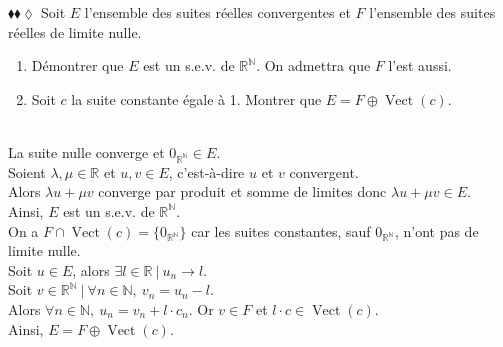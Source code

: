 \documentclass[11pt]{article}
\newcommand*{\R}{\mathbb{R}}
\newcommand*{\N}{\mathbb{N}}
\DeclareMathOperator*{\vect}{Vect}
\begin{document}
\begin{exercise}{$\blacklozenge\blacklozenge\lozenge$}{}
    Soit $E$ l'ensemble des suites réelles convergentes et $F$ l'ensemble des suites réelles de limite nulle.
    \begin{enumerate}[topsep=0pt,itemsep=-0.9ex]
        \item Démontrer que $E$ est un s.e.v. de $\R^\N$. On admettra que $F$ l'est aussi.
        \item Soit $c$ la suite constante égale à 1. Montrer que $E = F \oplus \vect(c)$.
    \end{enumerate}
    \tcblower\\[0.2cm]
     La suite nulle converge et $0_{\R^\N} \in E$.\\
    Soient $\lambda, \mu \in \R$ et $u, v \in E$, c'est-à-dire $u$ et $v$ convergent.\\
    Alors $\lambda u + \mu v$ converge par produit et somme de limites donc $\lambda u + \mu v \in E$.\\
    Ainsi, $E$ est un s.e.v. de $\R^\N$.\\[0.3cm]
     On a $F \cap \vect(c) = \{0_{\R^\N}\}$ car les suites constantes, sauf $0_{\R^\N}$, n'ont pas de limite nulle.\\
    Soit $u \in E$, alors $\exists l \in \R ~ | ~ u_n \to l$.\\
    Soit $v\in\R^\N ~ | ~ \forall n \in \N, ~ v_n = u_n - l$.\\
    Alors $\forall n \in \N, ~ u_n = v_n + l \cdot c_n$. Or $v \in F$ et $l \cdot c \in \vect(c)$.\\
    Ainsi, $E = F \oplus \vect(c)$.
\end{exercise}
\end{document}
